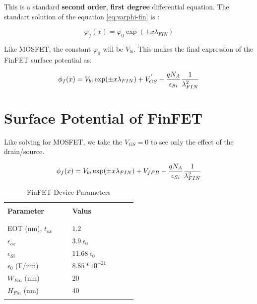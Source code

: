 \documentclass[a4paper]{article}
\begin{document}
This is a standard \textbf{second order}, \textbf{first degree} differential equation. The standart solution of the equation \ref{eq:varphi-fin} is :

\begin{equation}
  \varphi_f(x) = \varphi_0 \exp(\pm x \lambda_{FIN})
\end{equation}

Like MOSFET, the constant $\varphi_0$ will be $V_{bi}$. This makes the final expression of the FinFET surface potential as:

\begin{equation}
  \phi_f(x) = V_{bi} \exp(\pm x \lambda_{FIN}) + V_{GS}^{'} - \frac{qN_A} {\epsilon_{Si}} \frac{1}{\lambda_{FIN}^2}
\end{equation}

\section{Surface Potential of FinFET}

Like solving for MOSFET, we take the $V_{GS} = 0$ to see only the effect of the drain/source.

\begin{equation}
  \label{eq:Fin-sur-pot-S}
  \phi_f(x) = V_{bi} \exp(\pm x \lambda_{FIN}) + V_{fFB} - \frac{qN_A} {\epsilon_{Si}} \frac{1}{\lambda_{FIN}^2}
\end{equation}



\begin{table}[!h]
  \caption{FinFET Device Parameters}
  \label{tab:Fin-device-table}
  \centering
  \begin{tabular}{p{0.4\linewidth} p{0.4\linewidth} }
    \hline
    \hline
     & \\
    \textbf{Parameter} & \textbf{Valus}\\
     & \\
    \hline
    & \\
    EOT (nm), $t_{ox}$ \cite{book:Q-FinFET} & $1.2$\\
    $\epsilon_{ox}$ & $3.9~\epsilon_0$\\
    $\epsilon_{Si}$ & $11.68~\epsilon_0$\\
    $\epsilon_0$ (F/nm) & $8.85 * 10^{-21}$\\
    $W_{Fin}$ (nm) \cite{book:Q-FinFET}& 20 \\
    $H_{Fin}$ (nm) \cite{book:Q-FinFET}& 40\\
    & \\
    \hline
    \hline
  \end{tabular}
\end{table}
\end{document}
